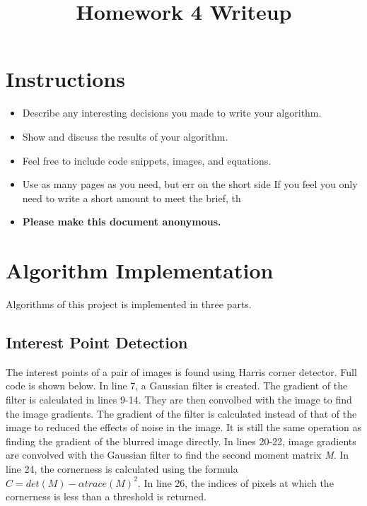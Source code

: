 \date{}

\title{\vspace{-1cm}Homework 4 Writeup}



\maketitle
\vspace{-3cm}
\thispagestyle{fancy}

\section*{Instructions}
\begin{itemize}
  \item Describe any interesting decisions you made to write your algorithm.
  \item Show and discuss the results of your algorithm.
  \item Feel free to include code snippets, images, and equations.
  \item Use as many pages as you need, but err on the short side If you feel you only need to write a short amount to meet the brief, th
  
  \item \textbf{Please make this document anonymous.}
\end{itemize}

\section*{Algorithm Implementation}

Algorithms of this project is implemented in three parts. 

\subsection{Interest Point Detection}
The interest points of a pair of images is found using Harris corner detector. Full code is shown below. In line 7, a Gaussian filter is created. The gradient of the filter is calculated in lines 9-14. They are then convolbed with the image to find the image gradients. The gradient of the filter is calculated instead of that of the image to reduced the effects of noise in the image. It is still the same operation as finding the gradient of the blurred image directly. In lines 20-22, image gradients are convolved with the Gaussian filter to find the second moment matrix \emph{M}. In line 24, the cornerness is calculated using the formula $C=det(M)-\alpha trace(M)^2$. In line 26, the indices of pixels at which the cornerness is less than a threshold is returned.

